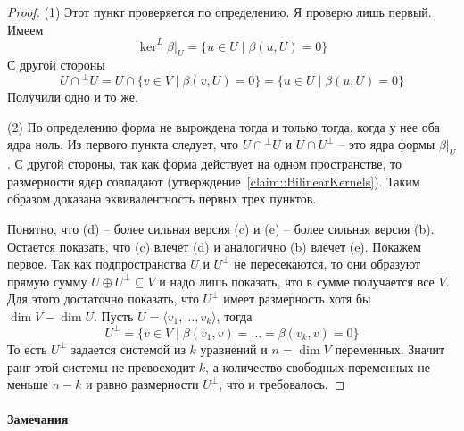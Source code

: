 \begin{proof}
(1) Этот пункт проверяется по определению.
Я проверю лишь первый.
Имеем
\[
\ker^L \beta|_U = \{u \in U\mid \beta(u, U) = 0\}
\]
С другой стороны
\[
U \cap {}^\bot U = U \cap \{v\in V\mid \beta(v, U) = 0\} = \{u\in U\mid \beta(u, U) = 0\}
\]
Получили одно и то же.

(2) По определению форма не вырождена тогда и только тогда, когда у нее оба ядра ноль.
Из первого пункта следует, что $U\cap {}^\bot U$ и $U\cap U^\bot$ -- это ядра формы $\beta|_U$.
С другой стороны, так как форма действует на одном пространстве, то размерности ядер совпадают (утверждение~\ref{claim::BilinearKernels}).
Таким образом доказана эквивалентность первых трех пунктов.

Понятно, что (d) -- более сильная версия (c) и (e) -- более сильная версия (b).
Остается показать, что (c) влечет (d) и аналогично (b) влечет (e).
Покажем первое.
Так как подпространства $U$ и $U^\bot$ не пересекаются, то они образуют прямую сумму $U\oplus U^\bot \subseteq V$ и надо лишь показать, что в сумме получается все $V$.
Для этого достаточно показать, что $U^\bot$ имеет размерность хотя бы $\dim V - \dim U$.
Пусть $U = \langle v_1,\ldots, v_k\rangle$, тогда 
\[
U^\bot = \{v\in V \mid \beta(v_1, v) = \ldots = \beta(v_k, v) = 0\}
\]
То есть $U^\bot$ задается системой из $k$ уравнений и $n = \dim V$ переменных.
Значит ранг этой системы не превосходит $k$, а количество свободных переменных не меньше $n - k$ и равно размерности $U^\bot$, что и требовалось.
\end{proof}

\paragraph{Замечания}

